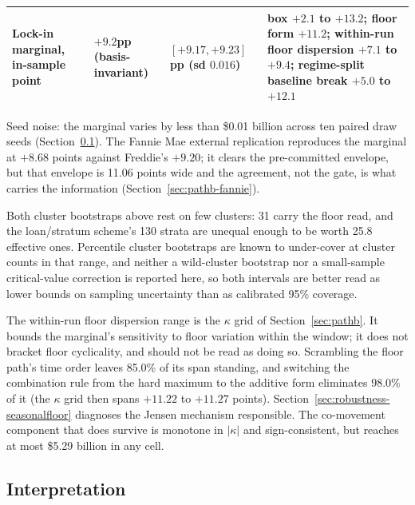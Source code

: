 \documentclass[12pt]{article}
\begin{document}
\begin{table}[H]
\begin{threeparttable}
\begin{tabular}{@{}p{2.4cm}p{3.3cm}p{4.0cm}p{4.8cm}@{}}
\addlinespace
Lock-in marginal, in-sample point & $+9.2$pp (basis-invariant) & $[+9.17, +9.23]$pp (sd $0.016$) & box $+2.1$ to $+13.2$; floor form $+11.2$; within-run floor dispersion $+7.1$ to $+9.4$; regime-split baseline break $+5.0$ to $+12.1$ \\
\bottomrule
\end{tabular}
\begin{tablenotes}[flushleft]\footnotesize
\item Seed noise: the marginal varies by less than \$0.01 billion across ten paired draw seeds (Section~\ref{sec:hazard-interp}). The Fannie Mae external replication reproduces the marginal at $+8.68$ points against Freddie's $+9.20$; it clears the pre-committed envelope, but that envelope is 11.06 points wide and the agreement, not the gate, is what carries the information (Section~\ref{sec:pathb-fannie}).
\item Both cluster bootstraps above rest on few clusters: 31 carry the floor read, and the loan/stratum scheme's 130 strata are unequal enough to be worth 25.8 effective ones. Percentile cluster bootstraps are known to under-cover at cluster counts in that range, and neither a wild-cluster bootstrap nor a small-sample critical-value correction is reported here, so both intervals are better read as lower bounds on sampling uncertainty than as calibrated 95\% coverage.
\item The within-run floor dispersion range is the $\kappa$ grid of Section~\ref{sec:pathb}. It bounds the marginal's sensitivity to floor variation within the window; it does not bracket floor cyclicality, and should not be read as doing so. Scrambling the floor path's time order leaves 85.0\% of its span standing, and switching the combination rule from the hard maximum to the additive form eliminates 98.0\% of it (the $\kappa$ grid then spans $+11.22$ to $+11.27$ points). Section~\ref{sec:robustness-seasonalfloor} diagnoses the Jensen mechanism responsible. The co-movement component that does survive is monotone in $|\kappa|$ and sign-consistent, but reaches at most \$5.29 billion in any cell.
\end{tablenotes}
\end{threeparttable}
\end{table}

\subsection{Interpretation}\label{sec:hazard-interp}
\end{document}
